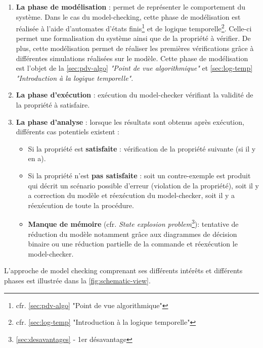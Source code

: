 \documentclass[runningheads,a4paper,10pt]{llncs}
\begin{document}
\begin{enumerate}
 \item  \textbf{La phase de modélisation} : permet de représenter le comportement du système. Dans le cas du model-checking, cette phase de modélisation est réalisée à l'aide d'automates d'états finis\footnote{cfr. \autoref{sec:pdv-algo} "Point de vue algorithmique"} et de logique temporelle\footnote{cfr. \autoref{sec:log-temp} "Introduction à la logique temporelle"}. Celle-ci permet une formalisation du système ainsi que de la propriété à vérifier. De plus, cette modélisation permet de réaliser les premières vérifications grâce à différentes simulations réalisées sur le modèle. Cette phase de modélisation est l'objet de la \autoref{sec:pdv-algo} \textit{"Point de vue algorithmique"} et \autoref{sec:log-temp} \textit{"Introduction à la logique temporelle"}. 
 \item  \textbf{La phase d'exécution} : exécution du model-checker vérifiant la validité de la propriété à satisfaire. 
 \item  \textbf{La phase d'analyse} : lorsque les résultats sont obtenus après exécution, différents cas potentiels existent : 
 \begin{itemize}
 \item Si la propriété est \textbf{satisfaite} : vérification de la propriété suivante (si il y en a). 
 \item Si la propriété n'est \textbf{pas satisfaite} : soit un contre-exemple est produit qui décrit un scénario possible d’erreur (violation de la propriété), soit il y a correction du modèle et réexécution du model-checker, soit il y a réexécution de toute la procédure. 
 \item \textbf{Manque de mémoire} (cfr. \textit{State explosion problem}\footnote{\autoref{sec:desavantages} - 1er désavantage}): tentative de réduction du modèle notamment grâce aux diagrammes de décision binaire ou une réduction partielle de la commande et réexécution le model-checker. 
 \end{itemize}
 \end{enumerate} 
 
L'approche de model checking comprenant ses différents intérêts et différents phases est illustrée dans la \autoref{fig:schematic-view}.  
 
\end{document}
